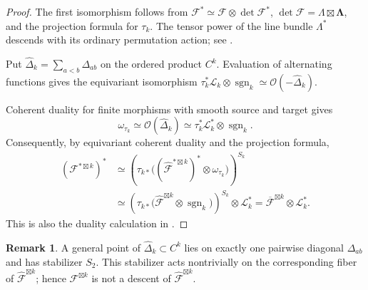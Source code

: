 \documentclass[11pt,letterpaper]{amsart}
\theoremstyle{plain}
\theoremstyle{definition}
\newtheorem{remark}[theorem]{Remark}
\theoremstyle{remark}
\numberwithin{equation}{section}
\begin{document}
\begin{proof}
The first isomorphism follows from
$\mathcal F^*\simeq\mathcal F\otimes\det\mathcal F^*$,
$\det\mathcal F=\Lambda\boxtimes\boldsymbol\Lambda$, and the
projection formula for $\tau_k$.  The tensor power of the line bundle
$\Lambda^*$ descends with its ordinary permutation action; see
\cite[Lemma~3.13]{TT}.

Put $\widehat\Delta_k=\sum_{a<b}\Delta_{ab}$ on the ordered product $C^k$.
Evaluation of alternating functions gives the equivariant isomorphism
$
 \tau_k^*\mathscr L_k\otimes\operatorname{sgn}_k
 \simeq\mathcal O(-\widehat\Delta_k)
$.

Coherent duality for finite morphisms with smooth source and target gives
\begin{equation}\label{eq:relative-dualizing-linearization}
 \omega_{\tau_k}\simeq\mathcal O(\widehat\Delta_k)
 \simeq\tau_k^*\mathscr L_k^*\otimes\operatorname{sgn}_k.
\end{equation}
Consequently, by equivariant coherent duality and the projection formula,
\begin{align*}
 (\mathcal F^{*\boxtimes k})^*
 &\simeq
 \left(\tau_{k*}\bigl(
 (\widehat{\mathcal F}^{*\boxtimes k})^*
       \otimes\omega_{\tau_k}\bigr)\right)^{S_k}\\
 &\simeq
 \left(\tau_{k*}\bigl(
 \widehat{\mathcal F}^{\boxtimes k}
       \otimes\operatorname{sgn}_k\bigr)\right)^{S_k}
       \otimes\mathscr L_k^*
 =\overline{\mathcal F}^{\boxtimes k}\otimes\mathscr L_k^*.
\end{align*}
This is also the duality calculation in \cite[Lemma~3.13]{TT}.
\end{proof}



\begin{remark}
A general point of 
$\widehat\Delta_k\subset C^k$ lies on exactly one pairwise diagonal $\Delta_{ab}$ and has stabilizer $S_2$.  This stabilizer acts
nontrivially on the corresponding  fiber of $\widehat{\mathcal F}^{\boxtimes k}$; hence
$\mathcal F^{\boxtimes k}$ is not a
descent of $\widehat{\mathcal F}^{\boxtimes k}$.
\end{remark}
\end{document}
